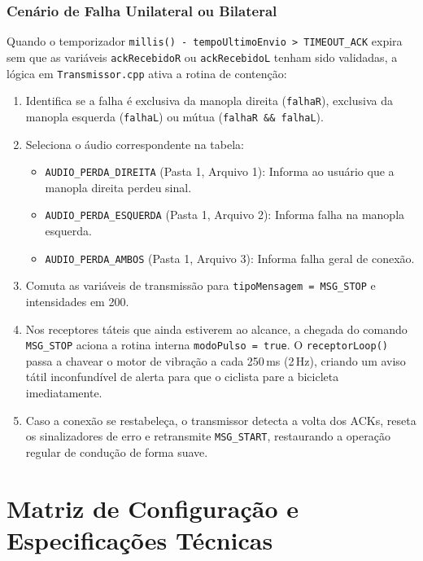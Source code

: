 \documentclass[12pt,a4paper]{article}
\begin{document}
\subsubsection{Cenário de Falha Unilateral ou Bilateral}
Quando o temporizador \texttt{millis() - tempoUltimoEnvio > TIMEOUT\_ACK} expira sem que as variáveis \texttt{ackRecebidoR} ou \texttt{ackRecebidoL} tenham sido validadas, a lógica em \texttt{Transmissor.cpp} ativa a rotina de contenção:
\begin{enumerate}
    \item Identifica se a falha é exclusiva da manopla direita (\texttt{falhaR}), exclusiva da manopla esquerda (\texttt{falhaL}) ou mútua (\texttt{falhaR \&\& falhaL}).
    \item Seleciona o áudio correspondente na tabela:
    \begin{itemize}
        \item \texttt{AUDIO\_PERDA\_DIREITA} (Pasta 1, Arquivo 1): Informa ao usuário que a manopla direita perdeu sinal.
        \item \texttt{AUDIO\_PERDA\_ESQUERDA} (Pasta 1, Arquivo 2): Informa falha na manopla esquerda.
        \item \texttt{AUDIO\_PERDA\_AMBOS} (Pasta 1, Arquivo 3): Informa falha geral de conexão.
    \end{itemize}
    \item Comuta as variáveis de transmissão para \texttt{tipoMensagem = MSG\_STOP} e intensidades em 200.
    \item Nos receptores táteis que ainda estiverem ao alcance, a chegada do comando \texttt{MSG\_STOP} aciona a rotina interna \texttt{modoPulso = true}. O \texttt{receptorLoop()} passa a chavear o motor de vibração a cada 250\,ms (2\,Hz), criando um aviso tátil inconfundível de alerta para que o ciclista pare a bicicleta imediatamente.
    \item Caso a conexão se restabeleça, o transmissor detecta a volta dos ACKs, reseta os sinalizadores de erro e retransmite \texttt{MSG\_START}, restaurando a operação regular de condução de forma suave.
\end{enumerate}

\newpage
\section{Matriz de Configuração e Especificações Técnicas}
\end{document}
